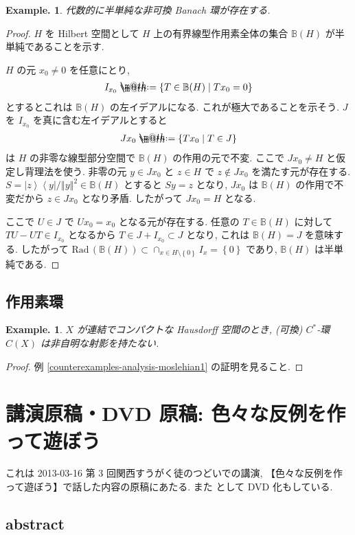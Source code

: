 \documentclass[openany, a4paper, oneside]{jsbook}
\makeatletter
\newcommand*{\defeq}{\mathrel{\rlap{%
\raisebox{0.3ex}{$\m@th\cdot$}}%
\raisebox{-0.3ex}{$\m@th\cdot$}}%
=}
\newcommand{\Rad}{\mathrm{Rad}\,}
\theoremstyle{break}
\theoremstyle{breakdefn}
\newtheorem{ex}[thm]{Example.}
\newcommand{\norm}[1]{\left\Vert#1\right\Vert}
\newcommand{\cbk}[1]{\left\{#1\right\}}
\newcommand{\relmiddle}[1]{\mathrel{}\middle#1\mathrel{}}
\newcommand{\set}[2]{\left\{#1 \relmiddle| #2\right\}}
\newcommand{\bra}[1]{\left\langle #1 \right|}
\newcommand{\ket}[1]{\left| #1 \right\rangle}
\newcommand{\bbB}{\mathbb{B}}
\makeatother
\begin{document}
\begin{ex}
代数的に半単純な非可換 Banach 環が存在する.
\end{ex}
\begin{proof}
$H$ を Hilbert 空間として $H$ 上の有界線型作用素全体の集合
$\bbB (H)$ が半単純であることを示す.

$H$ の元 $x_0 \neq 0$ を任意にとり,
\begin{align}
 I_{x_0}
 \defeq
 \set{T \in \bbB(H)}{T x_0 = 0}
\end{align}
とするとこれは $\bbB (H)$ の左イデアルになる.
これが極大であることを示そう.
$J$ を $I_{x_0}$ を真に含む左イデアルとすると
\begin{align}
 J x_0
 \defeq
 \set{T x_0}{T \in J}
\end{align}
は $H$ の非零な線型部分空間で $\bbB(H)$ の作用の元で不変.
ここで $J x_0 \neq H$ と仮定し背理法を使う.
非零の元 $y \in J x_0$ と $z \in H$ で $z \notin J x_0$ を満たす元が存在する.
$S = \ket{z} \bra{y} / \norm{y}^2 \in \bbB(H)$ とすると $Sy = z$ となり,
$J x_0$ は $\bbB(H)$ の作用で不変だから $z \in J x_{0}$ となり矛盾.
したがって $J x_0 = H$ となる.

ここで $U \in J$ で $U x_0 = x_0$ となる元が存在する.
任意の $T \in \bbB(H)$ に対して $TU - UT \in I_{x_0}$ となるから
$T \in J + I_{x_0} \subset J$ となり, これは $\bbB (H) = J$ を意味する.
したがって $\Rad (\bbB(H)) \subset \cap_{x \in H \setminus \cbk{0}} I_x = \cbk{0}$ であり,
$\bbB(H)$ は半単純である.
\end{proof}
\section{作用素環}


\begin{ex}
$X$ が連結でコンパクトな Hausdorff 空間のとき,
(可換) $C^*$-環 $C(X)$ は非自明な射影を持たない.
\end{ex}
\begin{proof}
例 \ref{counterexamples-analysis-moslehian1} の証明を見ること.
\end{proof}
\chapter{講演原稿・DVD 原稿:  色々な反例を作って遊ぼう}


これは 2013-03-16 第 3 回関西すうがく徒のつどいでの講演,
【色々な反例を作って遊ぼう】で話した内容の原稿にあたる.
また \cite{phasetr1} として DVD 化もしている.
\section{abstract}
\end{document}
